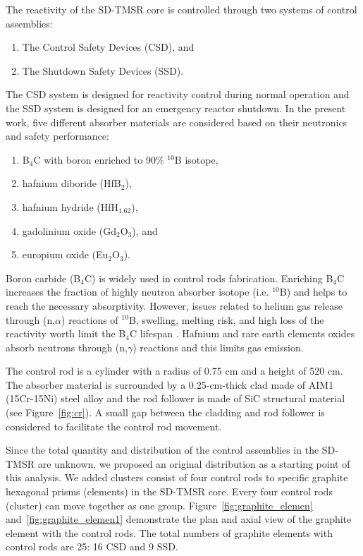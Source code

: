 The reactivity of the SD-TMSR core is controlled through two systems of control assemblies:
\begin{enumerate}
\item The Control Safety Devices (CSD), and
\item The Shutdown Safety Devices (SSD).
\end{enumerate}
The CSD system is designed for reactivity control during normal operation and the SSD system is designed for an emergency reactor shutdown.
In the present work, five different absorber materials are considered based on their neutronics and safety performance:
\begin{enumerate}
\item B$_4$C with boron enriched to 90\% $^{10}$B isotope,
\item hafnium diboride (HfB$_2$),
\item hafnium hydride (HfH$_{1.62}$),
\item gadolinium oxide (Gd$_2$O$_3$), and
\item europium oxide (Eu$_2$O$_3$).
\end{enumerate}
Boron carbide (B$_4$C) is widely used in control rods fabrication. Enriching B$_4$C increases the fraction of highly neutron absorber isotope (i.e. $^{10}$B) and helps to reach the necessary absorptivity. However, issues related to helium gas release through (n,$\alpha$) reactions of $^{10}$B, swelling, melting risk, and high loss of the reactivity worth limit the B$_4$C lifespan \cite{guo2019optimized}. Hafnium and rare earth elements oxides absorb neutrons through (n,$\gamma$) reactions and this limits gas emission.

The control rod is a cylinder with a radius of 0.75 cm and a height of 520 cm. The absorber material is surrounded by a 0.25-cm-thick clad made of AIM1 (15Cr-15Ni) steel alloy \cite{SERAN2017285} and the rod follower is made of SiC structural material (see Figure~\ref{fig:cr}). A small gap between the cladding and rod follower is considered to facilitate the control rod movement.

Since the total quantity and distribution of the control assemblies in the SD-TMSR are unknown, we proposed an original distribution as a starting point of this analysis. We added clusters consist of four control rods to specific graphite hexagonal prisms (elements) in the SD-TMSR core. Every four control rods (cluster) can move together as one group. Figure~\ref{fig:graphite_elemen} and~\ref{fig:graphite_elemen1} demonstrate the plan and axial view of the graphite element with the control rods. The total numbers of graphite elements with control rods are 25: 16 CSD and 9 SSD.

